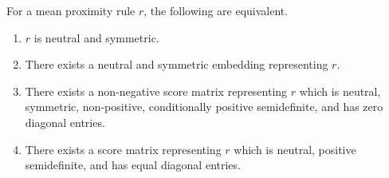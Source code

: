 \documentclass[prodmode]{acmsmall-ec14}
\begin{document}
\begin{theorem}
For a mean proximity rule $r$, the following are equivalent. 
\begin{enumerate}
\item $r$ is neutral and symmetric.
\item There exists a neutral and symmetric embedding representing $r$.
\item There exists a non-negative score matrix representing $r$ which is neutral, symmetric, non-positive, conditionally positive semidefinite, and has zero diagonal entries. 
\item There exists a score matrix representing $r$ which is neutral, positive semidefinite, and has equal diagonal entries.
\end{enumerate}
\label{thm:neutral-smpr}
\end{theorem}
\end{document}
